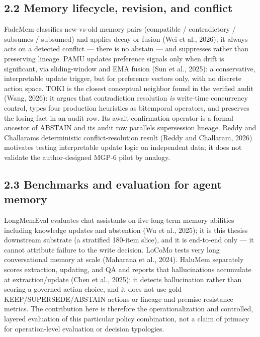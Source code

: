 \subsection{2.2 Memory lifecycle, revision, and
conflict}\label{memory-lifecycle-revision-and-conflict}

FadeMem classifies new-vs-old memory pairs (compatible / contradictory /
subsumes / subsumed) and applies decay or fusion (Wei et al., 2026); it
always acts on a detected conflict --- there is no abstain --- and
suppresses rather than preserving lineage. PAMU updates preference
signals only when drift is significant, via sliding-window and EMA
fusion (Sun et al., 2025): a conservative, interpretable update trigger,
but for preference vectors only, with no discrete action space. TOKI is
the closest conceptual neighbor found in the verified audit (Wang,
2026): it argues that contradiction resolution \emph{is} write-time
concurrency control, types four production heuristics as bitemporal
operators, and preserves the losing fact in an audit row. Its
await-confirmation operator is a formal ancestor of ABSTAIN and its
audit row parallels supersession lineage. Reddy and
Challaram\textquotesingle s deterministic conflict-resolution result
(Reddy and Challaram, 2026) motivates testing interpretable update logic
on independent data; it does not validate the author-designed MGP-6
pilot by analogy.

\subsection{2.3 Benchmarks and evaluation for agent
memory}\label{benchmarks-and-evaluation-for-agent-memory}

LongMemEval evaluates chat assistants on five long-term memory abilities
including knowledge updates and abstention (Wu et al., 2025); it is this
thesis\textquotesingle s downstream substrate (a stratified 180-item
slice), and it is end-to-end only --- it cannot attribute failure to the
write decision. LoCoMo tests very long conversational memory at scale
(Maharana et al., 2024). HaluMem separately scores extraction, updating,
and QA and reports that hallucinations accumulate at extraction/update
(Chen et al., 2025); it detects hallucination rather than scoring a
governed action choice, and it does not use gold KEEP/SUPERSEDE/ABSTAIN
actions or lineage and premise-resistance metrics. The contribution here
is therefore the operationalization and controlled, layered evaluation
of this particular policy combination, not a claim of primacy for
operation-level evaluation or decision typologies.

